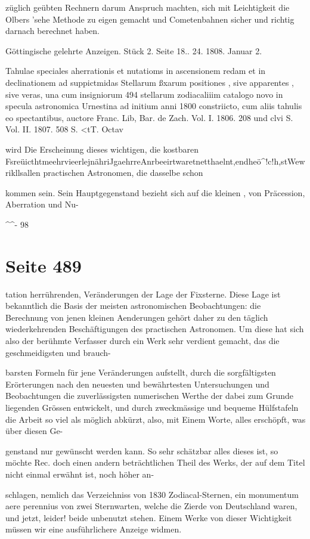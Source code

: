 \documentclass[10pt,a4paper]{article}
\begin{document}
züglich geübten Rechnern darum Anspruch machten, sich mit Leichtigkeit die Olbers 'sehe Methode zu eigen gemacht und Cometenbahnen sicher und richtig darnach berechnet haben.

Göttingische gelehrte Anzeigen. Stück 2. Seite 18.. 24. 1808. Januar 2.

Tahulae speciales aherrationis et nutatioms in ascensionem redam et in declinationem ad suppictmidas Stellarum ßxarum positiones , sive apparentes , sive veras, una cum insigniorum 494 stellarum zodiacaliiim catalogo novo in specula astronomica Urnestina ad initium anni 1800 constriicto, cum aliis tahulis eo spectantibus, auctore Franc. Lib, Bar. de Zach. Vol. I. 1806. 208 und clvi S. Vol. II. 1807. 508 S. <tT. Octav

wird Die Erscheinung dieses wichtigen, die kostbaren FsreüicthtmeehrvieerlejnähriJgaehrreAnrbeeirtwaretnetthaelnt,endheö\textasciicircum{}!c!h,stWewrikllsallen practischen Astronomen, die dasselbe schon

kommen sein. Sein Hauptgegenstand bezieht sich auf die kleinen , von Präcession, Aberration und Nu-

\textasciicircum{}\textasciicircum{}- 98


\newpage
\section*{Seite 489}
tation herrührenden, Veränderungen der Lage der Fixsterne. Diese Lage ist bekanntlich die Basis der meisten astronomischen Beobachtungen: die Berechnung von jenen kleinen Aenderungen gehört daher zu den täglich wiederkehrenden Beschäftigungen des practischen Astronomen. Um diese hat sich also der berühmte Verfasser durch ein Werk sehr verdient gemacht, das die geschmeidigsten und brauch-

barsten Formeln für jene Veränderungen aufstellt, durch die sorgfältigsten Erörterungen nach den neuesten und bewährtesten Untersuchungen und Beobachtungen die zuverlässigsten numerischen Werthe der dabei zum Grunde liegenden Grössen entwickelt, und durch zweckmässige und bequeme Hülfstafeln die Arbeit so viel als möglich abkürzt, also, mit Einem Worte, alles erschöpft, was über diesen Ge-

genstand nur gewünscht werden kann. So sehr schätzbar alles dieses ist, so möchte Rec. doch einen andern beträchtlichen Theil des Werks, der auf dem Titel nicht einmal erwähnt ist, noch höher an-

schlagen, nemlich das Verzeichniss von 1830 Zodiacal-Sternen, ein monumentum aere perennius von zwei Sternwarten, welche die Zierde von Deutschland waren, und jetzt, leider! beide unbenutzt stehen. Einem Werke von dieser Wichtigkeit müssen wir eine ausführlichere Anzeige widmen.
\end{document}
